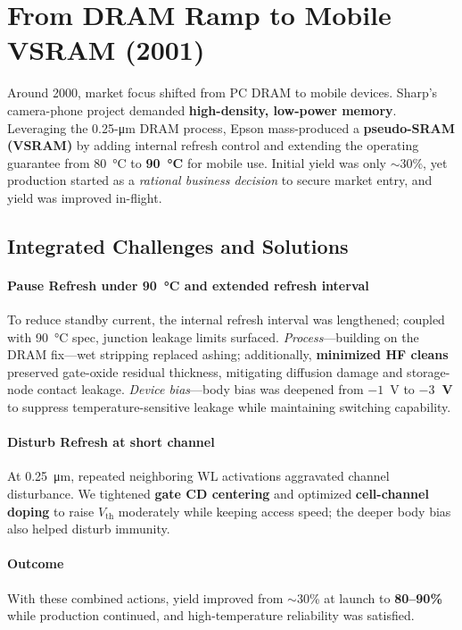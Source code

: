 \section{From DRAM Ramp to Mobile VSRAM (2001)}

Around 2000, market focus shifted from PC DRAM to mobile devices. Sharp's camera-phone project demanded \textbf{high-density, low-power memory}. Leveraging the 0.25-\si{\micro\meter} DRAM process, Epson mass-produced a \textbf{pseudo-SRAM (VSRAM)} by adding internal refresh control and extending the operating guarantee from 80~\si{\celsius} to \textbf{90~\si{\celsius}} for mobile use. Initial yield was only $\sim$30\%, yet production started as a \emph{rational business decision} to secure market entry, and yield was improved in-flight.

\subsection{Integrated Challenges and Solutions}

\paragraph{Pause Refresh under 90~\si{\celsius} and extended refresh interval}
To reduce standby current, the internal refresh interval was lengthened; coupled with 90~\si{\celsius} spec, junction leakage limits surfaced. 
\emph{Process}—building on the DRAM fix—wet stripping replaced ashing; additionally, \textbf{minimized HF cleans} preserved gate-oxide residual thickness, mitigating diffusion damage and storage-node contact leakage. 
\emph{Device bias}—body bias was deepened from $-1$~V to \textbf{$-3$~V} to suppress temperature-sensitive leakage while maintaining switching capability.

\paragraph{Disturb Refresh at short channel}
At 0.25~\si{\micro\meter}, repeated neighboring WL activations aggravated channel disturbance. We tightened \textbf{gate CD centering} and optimized \textbf{cell-channel doping} to raise $V_\mathrm{th}$ moderately while keeping access speed; the deeper body bias also helped disturb immunity.

\paragraph{Outcome}
With these combined actions, yield improved from $\sim$30\% at launch to \textbf{80–90\%} while production continued, and high-temperature reliability was satisfied.
